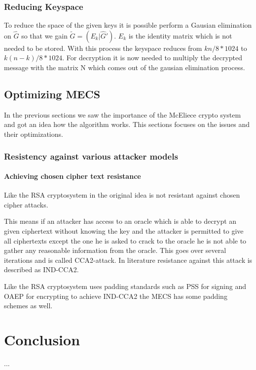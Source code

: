 \subsubsection{Reducing Keyspace}
To reduce the space of the given keys it is possible perform a Gausian elimination on $\hat{G}$ so that we gain $\tilde{G} = (E_{k}|\hat{G}')$. $E_{k}$ is the identity matrix which is not needed to be stored. With this process the keyspace reduces from $kn / 8 * 1024$ to $k(n-k) / 8 * 1024$.
For decryption it is now needed to multiply the decrypted message with the matrix N which comes out of the gausian elimination process. 
\subsection{Optimizing MECS}
In the previous sections we saw the importance of the McEliece crypto system and got an idea how the algorithm works. This sections focuses on the issues and their optimizations. 
\subsubsection{Resistency against various attacker models}
\paragraph{Achieving chosen cipher text resistance}

Like the RSA cryptosystem in the original idea is not resistant against chosen cipher attacks. 

This means if an attacker has access to an oracle which is able to decrypt an given ciphertext without knowing the key and the attacker is permitted to give all ciphertexts except the one he is asked to crack to the oracle he is not able to gather any reasonable information from the oracle. This goes over several iterations and is called CCA2-attack. In literature resistance against this attack is described as IND-CCA2. 

Like the RSA cryptosystem uses padding standards such as PSS for signing and OAEP for encrypting to achieve IND-CCA2 the MECS has some padding schemes as well.

\section{Conclusion}
...
